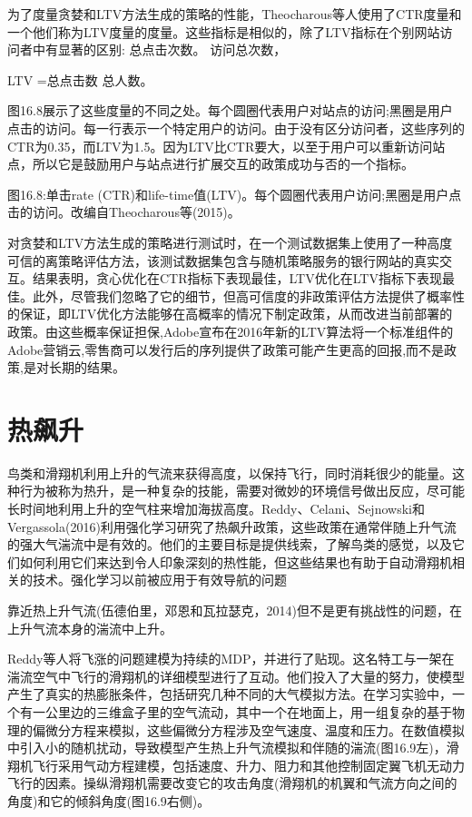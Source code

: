 为了度量贪婪和LTV方法生成的策略的性能，Theocharous等人使用了CTR度量和一个他们称为LTV度量的度量。这些指标是相似的，除了LTV指标在个别网站访问者中有显著的区别:
总点击次数。
访问总次数，

LTV =总点击数
总人数。

图16.8展示了这些度量的不同之处。每个圆圈代表用户对站点的访问;黑圈是用户点击的访问。每一行表示一个特定用户的访问。由于没有区分访问者，这些序列的CTR为0.35，而LTV为1.5。因为LTV比CTR要大，以至于用户可以重新访问站点，所以它是鼓励用户与站点进行扩展交互的政策成功与否的一个指标。
 

图16.8:单击rate (CTR)和life-time值(LTV)。每个圆圈代表用户访问;黑圈是用户点击的访问。改编自Theocharous等(2015)。

对贪婪和LTV方法生成的策略进行测试时，在一个测试数据集上使用了一种高度可信的离策略评估方法，该测试数据集包含与随机策略服务的银行网站的真实交互。结果表明，贪心优化在CTR指标下表现最佳，LTV优化在LTV指标下表现最佳。此外，尽管我们忽略了它的细节，但高可信度的非政策评估方法提供了概率性的保证，即LTV优化方法能够在高概率的情况下制定政策，从而改进当前部署的政策。由这些概率保证担保,Adobe宣布在2016年新的LTV算法将一个标准组件的Adobe营销云,零售商可以发行后的序列提供了政策可能产生更高的回报,而不是政策,是对长期的结果。


\section{热飙升}

鸟类和滑翔机利用上升的气流来获得高度，以保持飞行，同时消耗很少的能量。这种行为被称为热升，是一种复杂的技能，需要对微妙的环境信号做出反应，尽可能长时间地利用上升的空气柱来增加海拔高度。Reddy、Celani、Sejnowski和Vergassola(2016)利用强化学习研究了热飙升政策，这些政策在通常伴随上升气流的强大气湍流中是有效的。他们的主要目标是提供线索，了解鸟类的感觉，以及它们如何利用它们来达到令人印象深刻的热性能，但这些结果也有助于自动滑翔机相关的技术。强化学习以前被应用于有效导航的问题

靠近热上升气流(伍德伯里，邓恩和瓦拉瑟克，2014)但不是更有挑战性的问题，在上升气流本身的湍流中上升。

Reddy等人将飞涨的问题建模为持续的MDP，并进行了贴现。这名特工与一架在湍流空气中飞行的滑翔机的详细模型进行了互动。他们投入了大量的努力，使模型产生了真实的热膨胀条件，包括研究几种不同的大气模拟方法。在学习实验中，一个有一公里边的三维盒子里的空气流动，其中一个在地面上，用一组复杂的基于物理的偏微分方程来模拟，这些偏微分方程涉及空气速度、温度和压力。在数值模拟中引入小的随机扰动，导致模型产生热上升气流模拟和伴随的湍流(图16.9左)，滑翔机飞行采用气动方程建模，包括速度、升力、阻力和其他控制固定翼飞机无动力飞行的因素。操纵滑翔机需要改变它的攻击角度(滑翔机的机翼和气流方向之间的角度)和它的倾斜角度(图16.9右侧)。
 
